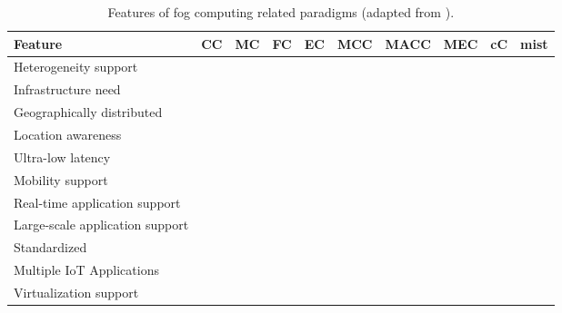 \begin{table}[!t]
	\caption{Features of fog computing related paradigms (adapted from \cite{yousefpour2018all}).}
	\scriptsize
	\begin{tabular*}{\textwidth}{l >{\centering\arraybackslash}m{0.4in} >{\centering\arraybackslash}m{0.4in} >{\centering\arraybackslash}m{0.4in} >{\centering\arraybackslash}m{0.4in} >{\centering\arraybackslash}m{0.4in} >{\centering\arraybackslash}m{0.4in} >{\centering\arraybackslash}m{0.4in} >{\centering\arraybackslash}m{0.4in} >{\centering\arraybackslash}m{0.4in}}
		\toprule
		\centering\textbf{Feature} & \textbf{CC} & \textbf{MC} & \textbf{FC} & \textbf{EC} & \textbf{MCC} & \textbf{MACC} & \textbf{MEC} & \textbf{cC} & \textbf{mist} \\[2pt]
		\toprule
		Heterogeneity support & \cmark &  & \cmark & \cmark & \cmark &  &  &  & \cmark \\ \midrule
		Infrastructure need & \cmark &  & \cmark & \cmark & \cmark &  & \cmark & \cmark & \cmark \\ \midrule
		Geographically distributed &  &  & \cmark & \cmark &  &  & \cmark & \cmark & \cmark \\ \midrule
		Location awareness &  & \cmark & \cmark & \cmark &  & \cmark & \cmark & \cmark & \cmark \\ \midrule
		Ultra-low latency &  &  & \cmark & \cmark &  &  & \cmark & \cmark & \cmark \\ \midrule
		Mobility support &  & \cmark & \cmark & \cmark & \cmark & \cmark & \cmark & \cmark & \cmark \\ \midrule
		Real-time application support &  &  & \cmark & \cmark &  &  & \cmark & \cmark & \cmark \\ \midrule
		Large-scale application support & \cmark &  & \cmark & \cmark &  &  & \cmark &  & \cmark \\ \midrule
		Standardized & \cmark & \cmark & \cmark & \cmark &  &  & \cmark &  &  \\ \midrule
		Multiple IoT Applications & \cmark &  & \cmark &  &  &  &  & \cmark & \cmark \\ \midrule
		Virtualization support & \cmark &  & \cmark &  &  &  & \cmark & \cmark &  \\ \bottomrule
	\end{tabular*}
	\label{computing_paradigms}
	\vspace{-5mm}
\end{table}